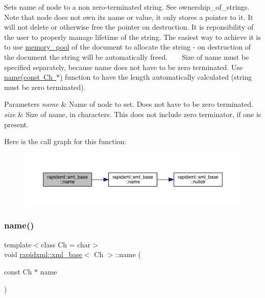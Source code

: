 Sets name of node to a non zero-\/terminated string. See ownership\+\_\+of\+\_\+strings. ~\newline
~\newline
 Note that node does not own its name or value, it only stores a pointer to it. It will not delete or otherwise free the pointer on destruction. It is reponsibility of the user to properly manage lifetime of the string. The easiest way to achieve it is to use \mbox{\hyperlink{classrapidxml_1_1memory__pool}{memory\+\_\+pool}} of the document to allocate the string -\/ on destruction of the document the string will be automatically freed. ~\newline
~\newline
 Size of name must be specified separately, because name does not have to be zero terminated. Use \mbox{\hyperlink{classrapidxml_1_1xml__base_a4611ddc82ac83a527c65606600eb2a0d}{name(const Ch $\ast$)}} function to have the length automatically calculated (string must be zero terminated).
\begin{DoxyParams}{Parameters}
{\em name} & Name of node to set. Does not have to be zero terminated.\\
\hline
{\em size} & Size of name, in characters. This does not include zero terminator, if one is present. \\
\hline
\end{DoxyParams}
Here is the call graph for this function\+:\nopagebreak
\begin{figure}[H]
\begin{center}
\leavevmode
\includegraphics[width=350pt]{classrapidxml_1_1xml__base_ae55060ae958c6e6465d6c8db852ec6ce_cgraph}
\end{center}
\end{figure}
\mbox{\label{classrapidxml_1_1xml__base_a4611ddc82ac83a527c65606600eb2a0d}} 
\subsubsection{\texorpdfstring{name()}{name()}\hspace{0.1cm}{\footnotesize\ttfamily [3/3]}}
{\footnotesize\ttfamily template$<$class Ch  = char$>$ \\
void \mbox{\hyperlink{classrapidxml_1_1xml__base}{rapidxml\+::xml\+\_\+base}}$<$ Ch $>$\+::name (\begin{DoxyParamCaption}\item[{const Ch $\ast$}]{name }\end{DoxyParamCaption})\hspace{0.3cm}{\ttfamily [inline]}}

